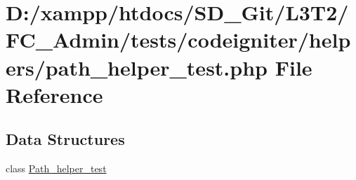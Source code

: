\hypertarget{path__helper__test_8php}{}\section{D\+:/xampp/htdocs/\+S\+D\+\_\+\+Git/\+L3\+T2/\+F\+C\+\_\+\+Admin/tests/codeigniter/helpers/path\+\_\+helper\+\_\+test.php File Reference}
\label{path__helper__test_8php}
\subsection*{Data Structures}
\begin{DoxyCompactItemize}
\item 
class \hyperlink{class_path__helper__test}{Path\+\_\+helper\+\_\+test}
\end{DoxyCompactItemize}
